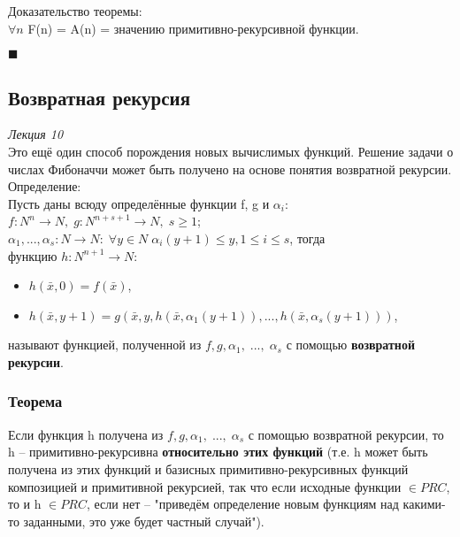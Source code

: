 \documentclass{article}
\begin{document}
        Доказательство теоремы:\\
        $\forall n$ F(n) = A(n) = значению примитивно-рекурсивной функции.
        \begin{flushright}
            $\blacksquare$\\
        \end{flushright}
        
        
    \subsection{Возвратная рекурсия}
    \emph{Лекция 10}\\
    
        Это ещё один способ порождения новых вычислимых функций. Решение задачи о числах Фибоначчи может быть получено на основе понятия возвратной рекурсии.\\
        
        Определение:\\
        Пусть даны всюду определённые функции f, g и $\alpha_{i}$:\\
        $f: N^{n} \rightarrow N,\; g: N^{n+s+1} \rightarrow N,\; s \geq 1$;\\
        $\alpha_1, ... , \alpha_s: N \rightarrow N:\; \forall y \in N \; \alpha_i (y + 1) \leq y, 1 \leq i \leq s$, тогда\\
        функцию $h: N^{n+1} \rightarrow N:$\\
        \begin{itemize}
            \item $h(\bar x, 0) = f(\bar x)$,
            \item $h(\bar x, y + 1) = g(\bar x, y, h(\bar x, \alpha_1(y + 1)), ... , h(\bar x, \alpha_s(y + 1)))$,
        \end{itemize}
        называют функцией, полученной из $f, g, \alpha_1,\; ...,\; \alpha_s$ с помощью \textbf{возвратной рекурсии}.
        
        \subsubsection{Теорема}
            Если функция h получена из $f, g, \alpha_1,\; ...,\; \alpha_s$ с помощью возвратной рекурсии, то h -- примитивно-рекурсивна \textbf{относительно этих функций} (т.е. h может быть получена из этих функций и базисных примитивно-рекурсивных функций композицией и примитивной рекурсией, так что если исходные функции $\in PRC$, то и h $\in PRC$, если нет -- "приведём определение новым функциям над какими-то заданными, это уже будет частный случай").
            
\end{document}
